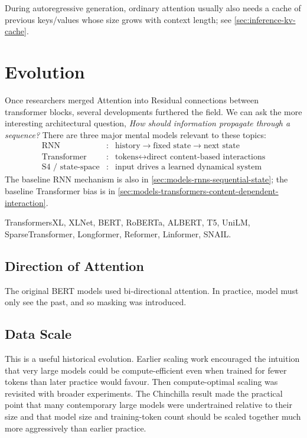 During autoregressive generation, ordinary attention usually also needs a cache of previous keys/values whose size grows with context length; see \cref{sec:inference-kv-cache}.





\section{Evolution}




Once researchers merged Attention into Residual connections between transformer blocks, several developments furthered the field.
We can ask the more interesting architectural question, \textit{How should information propagate through a sequence?}
There are three major mental models relevant to these topics:
\[
    \boxed{
    \begin{array}{lll}
    \text{RNN} &:& \text{history}\rightarrow\text{fixed state}\rightarrow\text{next state}\\
    \text{Transformer} &:& \text{tokens}\leftrightarrow\text{direct content-based interactions}\\
    \text{S4 / state-space} &:& \text{input drives a learned dynamical system}
    \end{array}
    }
\]
The baseline RNN mechanism is also in \cref{sec:models-rnns-sequential-state}; the baseline Transformer bias is in \cref{sec:models-transformers-content-dependent-interaction}.




TransformersXL, XLNet, BERT, RoBERTa, ALBERT, T5, UniLM, SparseTransformer, Longformer, Reformer, Linformer, SNAIL.

\subsection{Direction of Attention}
The original BERT models used bi-directional attention.
In practice, model must only see the past, and so masking was introduced. 

\subsection{Data Scale}
\label{subsec:modern-kaplan-chinchilla}
This is a useful historical evolution.
Earlier scaling work encouraged the intuition that very large models could be compute-efficient even when trained for fewer tokens than later practice would favour.
Then compute-optimal scaling was revisited with broader experiments.
The Chinchilla result made the practical point that many contemporary large models were undertrained relative to their size and that model size and training-token count should be scaled together much more aggressively than earlier practice.

